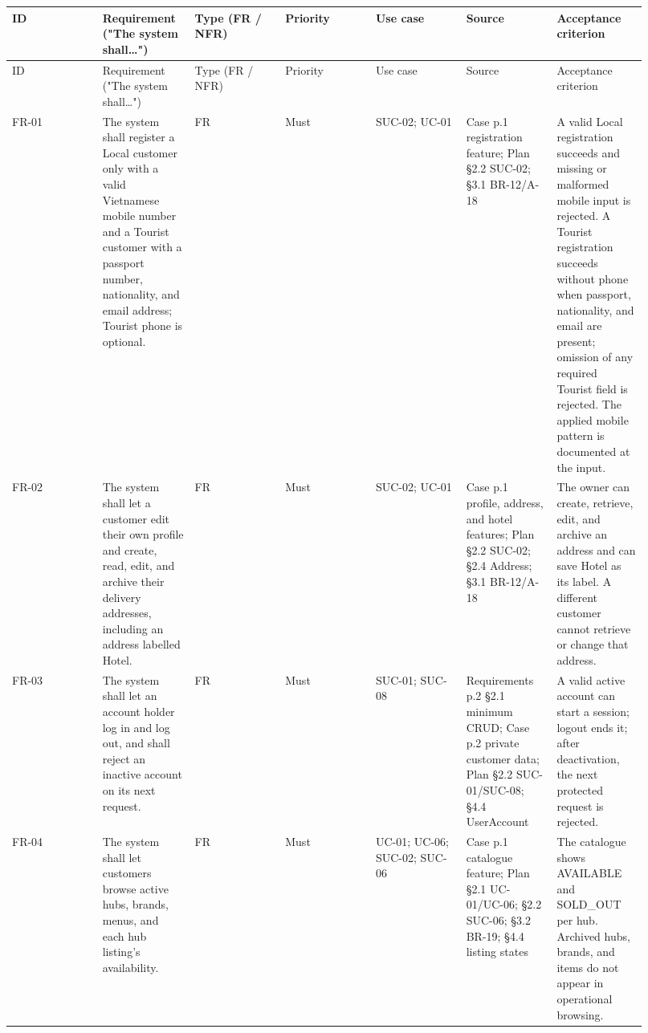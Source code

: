 \begin{landscape}
\begingroup\footnotesize
\begin{longtable}{>{\raggedright\arraybackslash}p{0.1314\linewidth}>{\raggedright\arraybackslash}p{0.1314\linewidth}>{\raggedright\arraybackslash}p{0.1314\linewidth}>{\raggedright\arraybackslash}p{0.1314\linewidth}>{\raggedright\arraybackslash}p{0.1314\linewidth}>{\raggedright\arraybackslash}p{0.1314\linewidth}>{\raggedright\arraybackslash}p{0.1314\linewidth}}
ID & Requirement ("The system shall\ldots{}") & Type (FR / NFR) & Priority & Use case & Source & Acceptance criterion \\
\hline\endfirsthead
ID & Requirement ("The system shall\ldots{}") & Type (FR / NFR) & Priority & Use case & Source & Acceptance criterion \\
\hline\endhead
FR-01 & The system shall register a Local customer only with a valid Vietnamese mobile number and a Tourist customer with a passport number, nationality, and email address; Tourist phone is optional. & FR & Must & SUC-02; UC-01 & Case p.1 registration feature; Plan \S{}2.2 SUC-02; \S{}3.1 BR-12/A-18 & A valid Local registration succeeds and missing or malformed mobile input is rejected. A Tourist registration succeeds without phone when passport, nationality, and email are present; omission of any required Tourist field is rejected. The applied mobile pattern is documented at the input. \\
FR-02 & The system shall let a customer edit their own profile and create, read, edit, and archive their delivery addresses, including an address labelled Hotel. & FR & Must & SUC-02; UC-01 & Case p.1 profile, address, and hotel features; Plan \S{}2.2 SUC-02; \S{}2.4 Address; \S{}3.1 BR-12/A-18 & The owner can create, retrieve, edit, and archive an address and can save Hotel as its label. A different customer cannot retrieve or change that address. \\
FR-03 & The system shall let an account holder log in and log out, and shall reject an inactive account on its next request. & FR & Must & SUC-01; SUC-08 & Requirements p.2 \S{}2.1 minimum CRUD; Case p.2 private customer data; Plan \S{}2.2 SUC-01/SUC-08; \S{}4.4 UserAccount & A valid active account can start a session; logout ends it; after deactivation, the next protected request is rejected. \\
FR-04 & The system shall let customers browse active hubs, brands, menus, and each hub listing's availability. & FR & Must & UC-01; UC-06; SUC-02; SUC-06 & Case p.1 catalogue feature; Plan \S{}2.1 UC-01/UC-06; \S{}2.2 SUC-06; \S{}3.2 BR-19; \S{}4.4 listing states & The catalogue shows AVAILABLE and SOLD\_OUT per hub. Archived hubs, brands, and items do not appear in operational browsing. \\

\end{longtable}
\end{landscape}
